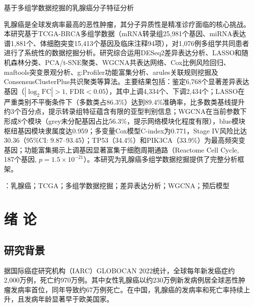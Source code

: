 \documentclass[12pt,a4paper,openany]{ctexbook}
\begin{document}


\setcounter{page}{1}

\begin{center}
{\heiti\Large 基于多组学数据挖掘的乳腺癌分子特征分析}
\end{center}
\vspace{2em}
\noindent 乳腺癌是全球发病率最高的恶性肿瘤，其分子异质性是精准诊疗面临的核心挑战。本研究基于TCGA-BRCA多组学数据（mRNA转录组25,981个基因、miRNA表达谱1,881个、体细胞突变15,413个基因及临床注释94项），对1,076例多组学共同患者进行了系统性的数据挖掘分析。研究综合运用DESeq2差异表达分析、LASSO和随机森林分类、PCA/t-SNE聚类、WGCNA共表达网络、Cox比例风险回归、maftools突变景观分析、g:Profiler功能富集分析、arules关联规则挖掘及ConsensusClusterPlus共识聚类等算法。主要结果包括：鉴定6,768个显著差异表达基因（$|\log_2\text{FC}|>1$, FDR$<0.05$），其中上调4,334个、下调2,434个；LASSO在严重类别不平衡条件下（多数类占86.3\%）达到89.4\%准确率，比多数类基线提升约3个百分点，提示转录组特征蕴含有限的亚型判别信息；WGCNA在当前参数下形成8个模块（grey未分配基因占比56.3\%，提示网络模块化程度有限），blue模块枢纽基因模块隶属度达0.959；多变量Cox模型C-index为0.771，Stage IV风险比达30.36（95\%CI: 9.87--93.45）；TP53（34.4\%）和PIK3CA（33.9\%）为最高频突变基因；功能富集揭示上调基因显著富集于细胞周期通路（Reactome Cell Cycle, 187个基因, $p=1.5\times10^{-21}$）。本研究为乳腺癌多组学数据挖掘提供了完整分析框架。

\vspace{1em}
\vspace{1em}：乳腺癌；TCGA；多组学数据挖掘；差异表达分析；WGCNA；预后模型

\newpage
\tableofcontents
\newpage
\renewcommand{\listfigurename}{图目录}
\listoffigures
\newpage
\renewcommand{\listtablename}{表目录}
\listoftables
\newpage
{}
\setcounter{page}{1}
\chapter{绪 论}

\section{研究背景}
据国际癌症研究机构（IARC）GLOBOCAN 2022统计，全球每年新发癌症约2,000万例，死亡约970万例\cite{sung2024global}。其中女性乳腺癌以约230万例新发病例居全球恶性肿瘤发病率首位，同年导致约67万例死亡。在中国，乳腺癌的发病率和死亡率持续上升，且发病年龄显著早于欧美国家。
\end{document}
